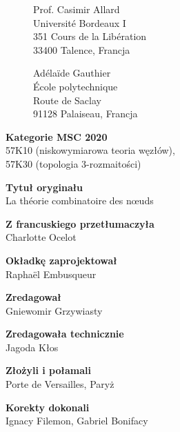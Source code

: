

\thispagestyle{empty}
\begin{figure}[H]
\begin{minipage}[b]{.48\linewidth}
{\noindent Prof. Casimir Allard\\
Université Bordeaux I\\
351 Cours de la Libération\\
33400 Talence, Francja}
\end{minipage}
\begin{minipage}[b]{.48\linewidth}
{\noindent Adélaïde Gauthier\\
École polytechnique\\
Route de Saclay\\
91128 Palaiseau, Francja}
\end{minipage}
\end{figure}

{\noindent \textbf{Kategorie MSC 2020}\\57K10 (niskowymiarowa teoria węzłów),\\57K30 (topologia 3-rozmaitości)} \vspace{5mm}

{\noindent \textbf{Tytuł oryginału}\\La théorie combinatoire des nœuds}
\vspace{5mm}

{\noindent \textbf{Z francuskiego przetłumaczyła}\\Charlotte Ocelot} 
\vspace{5mm}

{\noindent \textbf{Okładkę zaprojektował}\\Raphaël Embusqueur}
\vspace{5mm}

{\noindent \textbf{Zredagował}\\Gniewomir Grzywiasty}
\vspace{5mm}

{\noindent \textbf{Zredagowała technicznie}\\Jagoda Kłos}
\vspace{5mm}

{\noindent \textbf{Złożyli i połamali}\\Porte de Versailles, Paryż}
\vspace{5mm}

{\noindent \textbf{Korekty dokonali}\\Ignacy Filemon, Gabriel Bonifacy}

\vfill

